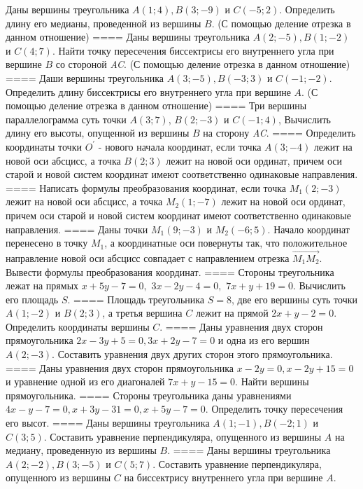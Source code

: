 Даны вершины треугольника \(A(1;4),B(3; - 9)\) и \(C( - 5;2)\). Определить длину его медианы, проведенной из вершины \(B\). (С помощью деление отрезка в данном отношение)
====
Даны вершины треугольника \(A(2; - 5),B(1; - 2)\) и \(C(4;7)\). Найти точку пересечения биссектрисы его внутреннего угла при вершине \(B\) со стороной \emph{AC}. (С помощью деление отрезка в данном отношение)
====
Даши вершины треугольника \(A(3; - 5),B( - 3;3)\) и \(C( - 1; - 2)\). Определить длину биссектрисы его внутреннего угла при вершине \(A\). (С помощью деление отрезка в данном отношение)
====
Три вершины параллелограмма суть точки \(A(3;7)\), \(B(2; - 3)\) и \(C( - 1;4)\), Вычислить длину его высоты, опущенной из вершины \(B\) на сторону \emph{AC}.
====
Определить координаты точки \(O^{'}\) - нового начала координат, если точка \(A(3; - 4)\) лежит на новой оси абсцисс, а точка \(B(2;3)\) лежит на новой оси ординат, причем оси старой и новой систем координат имеют соответственно одинаковые направления.
====
Написать формулы преобразования координат, если точка \(M_{1}(2; - 3)\) лежит на новой оси абсцисс, а точка \(M_{2}(1; - 7)\) лежит на новой оси ординат, причем оси старой и новой систем координат имеют соответственно одинаковые направления.
====
Даны точки \(M_{1}(9; - 3)\) и \(M_{2}( - 6;5)\). Начало координат перенесено в точку \(M_{1}\), а координатные оси повернуты так, что положительное направление новой оси абсцисс совпадает с направлением отрезка \(\overrightarrow{M_{1}M_{2}}\). Вывести формулы преобразования координат.
====
Стороны треугольника лежат на прямых \(x + 5y - 7 = 0,\) \(3x - 2y - 4 = 0,\) \(7x + y + 19 = 0\). Вычислить его площадь \(S\).
====
Площадь треугольника \(S = 8\), две его вершины суть точки \(A(1; - 2)\) и \(B(2;3)\), а третья вершина \(C\) лежит на прямой \(2x + y - 2 = 0\). Определить координаты вершины \(C\).
====
Даны уравнения двух сторон прямоугольника \(2x - 3y + 5 = 0,3x + 2y - 7 = 0\) и одна из его вершин \(A(2; - 3)\). Составить уравнения двух других сторон этого прямоугольника.
====
Даны уравнения двух сторон прямоугольника \(x - 2y = 0,x - 2y + 15 = 0\) и уравнение одной из его диагоналей \(7x + y - 15 = 0\). Найти вершины прямоугольника.
====
Стороны треугольника даны уравнениями \(4x - y - 7 = 0,x + 3y - 31 = 0,x + 5y - 7 = 0\). Определить точку пересечения его высот.
====
Даны вершины треугольника \(A(1; - 1),B( - 2;1)\) и \(C(3;5)\). Составить уравнение перпендикуляра, опущенного из вершины \(A\) на медиану, проведенную из вершины \(B\).
====
Даны вершины треугольника \(A(2; - 2),B(3; - 5)\) и \(C(5;7)\). Составить уравнение перпендикуляра, опущенного из вершины \(C\) на биссектрису внутреннего угла при вершине \(A\).
